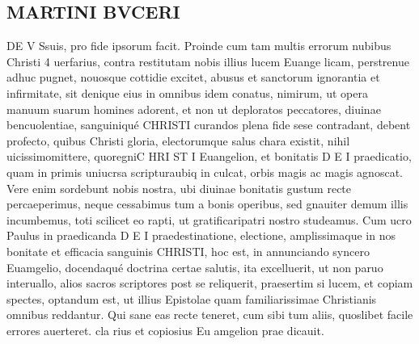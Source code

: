 \documentclass{article}
\begin{document}
\begin{pages}
\section*{MARTINI BVCERI }\pstart DE V Ssuis, pro fide ipsorum facit.  \pend\pstart Proinde cum tam multis errorum nubibus Christi 4 uerfarius, contra restitutam nobis illius lucem Euange licam, perstrenue adhuc pugnet, nouosque cottidie excitet, abusus et sanctorum ignorantia et infirmitate, sit denique eius in omnibus idem conatus, nimirum, ut opera manuum suarum homines adorent, et non ut deploratos peccatores, diuinae bencuolentiae, sanguiniqué CHRISTI curandos plena fide sese contradant, debent profecto, quibus Christi gloria, electorumque salus chara existit, nihil uicissimomittere, quoregniC HRI ST I Euangelion, et bonitatis D E I praedicatio, quam in primis uniucrsa scripturaubiq in culcat, orbis magis ac magis agnoscat.  Vere enim sordebunt nobis nostra, ubi diuinae bonitatis gustum recte percaeperimus, neque cessabimus tum a bonis operibus, sed gnauiter demum illis incumbemus, toti scilicet eo rapti, ut gratificaripatri nostro studeamus.  \pend\pstart Cum ucro Paulus in praedicanda D E I praedestinatione, electione, amplissimaque in nos bonitate et efficacia sanguinis CHRISTI, hoc est, in annunciando syncero Euamgelio, docendaqué doctrina certae salutis, ita excelluerit, ut non paruo interuallo, alios sacros scriptores post se reliquerit, praesertim si lucem, et copiam spectes, optandum est, ut illius Epistolae quam familiarissimae Christianis omnibus reddantur. Qui sane eas recte teneret, cum sibi tum aliis, quoslibet facile errores auerteret.  \pendPaulus cla rius et copiosius Eu amgelion prae dicauit. 

\end{pages}
\end{document}
